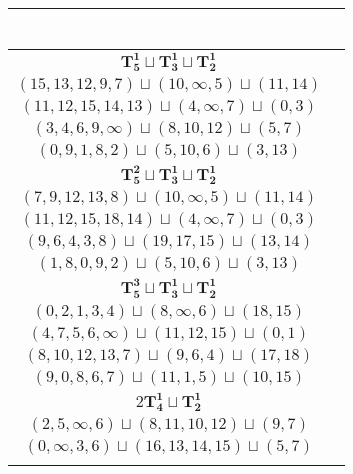 \documentclass{article}
\begin{document}
\begin{longtable}{|c|c|}
\begin{tabular}{c}
        \end{tabular} \\ 
        \hline
        $\mathbf{T_{5}^{1}} \sqcup \mathbf{T_{3}^{1}} \sqcup \mathbf{T_{2}^{1}}$ & \begin{tabular}{c}
        $(10,13,\infty,8,11)\sqcup(3,2,4)\sqcup(16,15)$ \\ 
        $(15,13,12,9,7)\sqcup(10,\infty,5)\sqcup(11,14)$ \\ 
        $(11,12,15,14,13)\sqcup(4,\infty,7)\sqcup(0,3)$ \\ 
        $(3,4,6,9,\infty)\sqcup(8,10,12)\sqcup(5,7)$ \\ 
        $(0,9,1,8,2)\sqcup(5,10,6)\sqcup(3,13)$
        \end{tabular} \\ 
        \hline
        $\mathbf{T_{5}^{2}} \sqcup \mathbf{T_{3}^{1}} \sqcup \mathbf{T_{2}^{1}}$ & \begin{tabular}{c}
        $(8,\infty,13,10,9)\sqcup(3,2,4)\sqcup(14,15)$ \\ 
        $(7,9,12,13,8)\sqcup(10,\infty,5)\sqcup(11,14)$ \\ 
        $(11,12,15,18,14)\sqcup(4,\infty,7)\sqcup(0,3)$ \\ 
        $(9,6,4,3,8)\sqcup(19,17,15)\sqcup(13,14)$ \\ 
        $(1,8,0,9,2)\sqcup(5,10,6)\sqcup(3,13)$
        \end{tabular} \\ 
        \hline
        $\mathbf{T_{5}^{3}} \sqcup \mathbf{T_{3}^{1}} \sqcup \mathbf{T_{2}^{1}}$ & \begin{tabular}{c}
        $(2,\infty,3,4,5)\sqcup(12,13,15)\sqcup(16,19)$ \\ 
        $(0,2,1,3,4)\sqcup(8,\infty,6)\sqcup(18,15)$ \\ 
        $(4,7,5,6,\infty)\sqcup(11,12,15)\sqcup(0,1)$ \\ 
        $(8,10,12,13,7)\sqcup(9,6,4)\sqcup(17,18)$ \\ 
        $(9,0,8,6,7)\sqcup(11,1,5)\sqcup(10,15)$
        \end{tabular} \\ 
        \hline
        $2\mathbf{T_{4}^{1}} \sqcup \mathbf{T_{2}^{1}}$ & \begin{tabular}{c}
        $(1,\infty,16,18)\sqcup(11,13,12,15)\sqcup(4,5)$ \\ 
        $(2,5,\infty,6)\sqcup(8,11,10,12)\sqcup(9,7)$ \\ 
        $(0,\infty,3,6)\sqcup(16,13,14,15)\sqcup(5,7)$ \\ 

\end{tabular}
\end{longtable}
\end{document}
